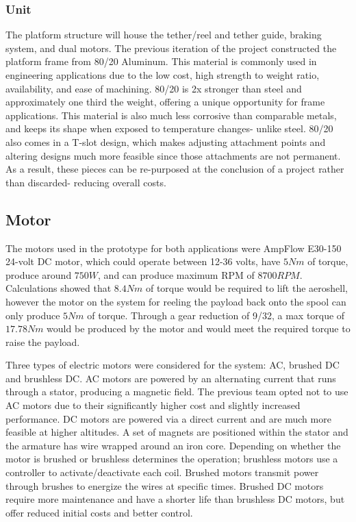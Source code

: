 \subsubsection{Unit}

\indent\indent The platform structure will house the tether/reel and tether guide, braking system, and dual motors. The previous iteration of the project constructed the platform frame from 80/20 Aluminum. This material is commonly used in engineering applications due to the low cost, high strength to weight ratio, availability, and ease of machining. 80/20 is 2x stronger than steel and approximately one third the weight, offering a unique opportunity for frame applications. This material is also much less corrosive than comparable metals, and keeps its shape when exposed to temperature changes- unlike steel. 80/20 also comes in a T-slot design, which makes adjusting attachment points and altering designs much more feasible since those attachments are not permanent. As a result, these pieces can be re-purposed at the conclusion of a project rather than discarded- reducing overall costs.

\subsection{Motor}

\indent\indent The motors used in the prototype for both applications were AmpFlow E30-150 24-volt DC motor, which could operate between 12-36 volts, have $5 Nm$ of torque, produce around $750 W$, and can produce maximum RPM of $8700 RPM$. Calculations showed that $8.4 Nm$ of torque would be required to lift the aeroshell, however the motor on the system for reeling the payload back onto the spool can only produce $5 Nm$ of torque. Through a gear reduction of 9/32, a max torque of $17.78 Nm$ would be produced by the motor and would meet the required torque to raise the payload.

\indent Three types of electric motors were considered for the system: AC, brushed DC and brushless DC. AC motors are powered by an alternating current that runs through a stator, producing a magnetic field. The previous team opted not to use AC motors due to their significantly higher cost and slightly increased performance. DC motors are powered via a direct current and are much more feasible at higher altitudes. A set of magnets are positioned within the stator and the armature has wire wrapped around an iron core. Depending on whether the motor is brushed or brushless determines the operation; brushless motors use a controller to activate/deactivate each coil. Brushed motors transmit power through brushes to energize the wires at specific times. Brushed DC motors require more maintenance and have a shorter life than brushless DC motors, but offer reduced initial costs and better control.

